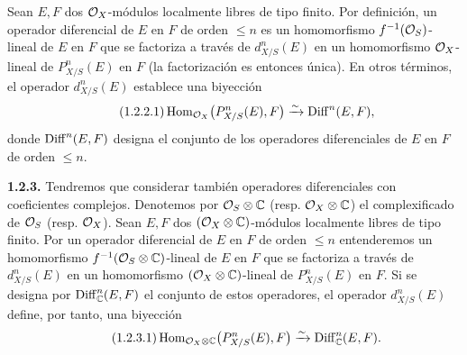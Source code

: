 Sean $E,F$ dos $\cO_X$-módulos localmente libres de tipo finito. Por definición, un operador diferencial de $E$ en $F$ de orden $\le n$ es un homomorfismo $\sisi{f^{-1}(\cO_X)}{f^{-1}(\cO_S)}$-lineal de $E$ en $F$ que se factoriza a través de $d^n_{X/S}(E)$ en un homomorfismo $\cO_X$-lineal de $P^n_{X/S}(E)$ en $F$ (la factorización es entonces única). En otros términos, el operador $d^n_{X/S}(E)$ establece una biyección
\begin{equation}\tag{1.2.2.1}
 \Homop_{\cO_X}\bigl(P^n_{X/S}(E),F\bigr)
 \xrightarrow{\sim}
 \Diff^n(E,F),
\end{equation}
donde $\Diff^n(E,F)$ designa el conjunto de los operadores diferenciales de $E$ en $F$ de orden $\le n$.

\textbf{1.2.3.} Tendremos que considerar también operadores diferenciales con coeficientes complejos. Denotemos por $\cO_S\otimes\mathbb C$ (resp. $\cO_X\otimes\mathbb C$) el complexificado de $\cO_S$ (resp. $\cO_X$). Sean $E,F$ dos $(\cO_X\otimes\mathbb C)$-módulos localmente libres de tipo finito. Por un operador diferencial de $E$ en $F$ de orden $\le n$ entenderemos un homomorfismo $f^{-1}(\cO_S\otimes\mathbb C)$-lineal de $E$ en $F$ que se factoriza a través de $d^n_{X/S}(E)$ en un homomorfismo $(\cO_X\otimes\mathbb C)$-lineal de $P^n_{X/S}(E)$ en $F$. Si se designa por $\Diff^n_\mathbb C(E,F)$ el conjunto de estos operadores, el operador $d^n_{X/S}(E)$ define, por tanto, una biyección
\begin{equation}\tag{1.2.3.1}
 \Homop_{\cO_X\otimes\mathbb C}\bigl(P^n_{X/S}(E),F\bigr)
 \xrightarrow{\sim}
 \Diff^n_\mathbb C(E,F).
\end{equation}

